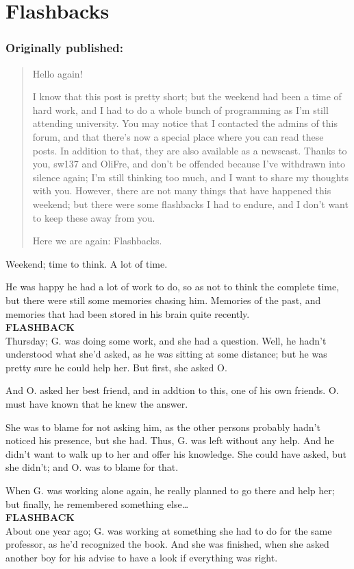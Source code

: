 \chapter{Flashbacks}
\label{cha:flashbacks}
\subsection*{Originally published: }
\begin{quote}
Hello again!

I know that this post is pretty short; but the weekend had been a time of hard work, and I had to do a whole bunch of programming as I'm still attending university. 
You may notice that I contacted the admins of this forum, and that there's now a special place where you can read these posts. In addition to that, they are also available as a newscast. 
Thanks to you, sw137 and OliFre, and don't be offended because I've withdrawn into silence again; I'm still thinking too much, and I want to share my thoughts with you. 
However, there are not many things that have happened this weekend; but there were some flashbacks I had to endure, and I don't want to keep these away from you.

Here we are again: Flashbacks.
\end{quote}

Weekend; time to think. 
A lot of time.

He was happy he had a lot of work to do, so as not to think the complete time, but there were still some memories chasing him. Memories of the past, and memories that had been stored in his brain quite recently.\\
\textbf{FLASHBACK}\\
Thursday; G. was doing some work, and she had a question. Well, he hadn't understood what she'd asked, as he was sitting at some distance; but he was pretty sure he could help her. 
But first, she asked O.

And O. asked her best friend, and in addtion to this, one of his own friends. 
O. must have known that he knew the answer. 

She was to blame for not asking him, as the other persons probably hadn't noticed his presence, but she had. Thus, G. was left without any help. And he didn't want to walk up to her and offer his knowledge. She could have asked, but she didn't; and O. was to blame for that. 

When G. was working alone again, he really planned to go there and help her; but finally, he remembered something else\ldots\\
\textbf{FLASHBACK}\\
About one year ago; G. was working at something she had to do for the same professor, as he'd recognized the book. And she was finished, when she asked another boy for his advise to have a look if everything was right.

